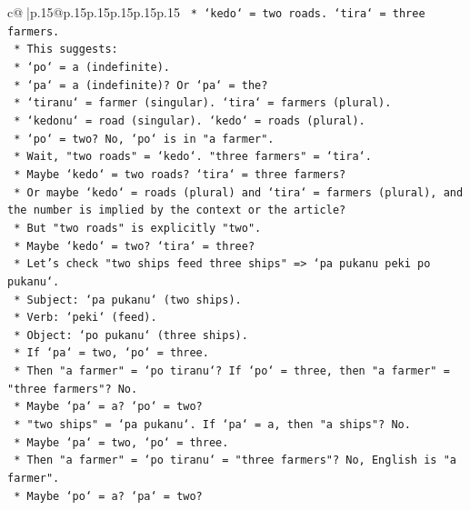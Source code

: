 \documentclass{article}
\begin{document}
{\begin{supertabular}{c@{$\;$}|p{.15\linewidth}@{}p{.15\linewidth}p{.15\linewidth}p{.15\linewidth}p{.15\linewidth}p{.15\linewidth}}
{{{\texttt{        *   `kedo` = two roads. `tira` = three farmers.} \\
\texttt{        *   This suggests:} \\
\texttt{            *   `po` = a (indefinite).} \\
\texttt{            *   `pa` = a (indefinite)? Or `pa` = the?} \\
\texttt{            *   `tiranu` = farmer (singular). `tira` = farmers (plural).} \\
\texttt{            *   `kedonu` = road (singular). `kedo` = roads (plural).} \\
\texttt{            *   `po` = two? No, `po` is in "a farmer".} \\
\texttt{            *   Wait, "two roads" = `kedo`. "three farmers" = `tira`.} \\
\texttt{            *   Maybe `kedo` = two roads? `tira` = three farmers?} \\
\texttt{            *   Or maybe `kedo` = roads (plural) and `tira` = farmers (plural), and the number is implied by the context or the article?} \\
\texttt{            *   But "two roads" is explicitly "two".} \\
\texttt{            *   Maybe `kedo` = two? `tira` = three?} \\
\texttt{            *   Let's check "two ships feed three ships" => `pa pukanu peki po pukanu`.} \\
\texttt{                *   Subject: `pa pukanu` (two ships).} \\
\texttt{                *   Verb: `peki` (feed).} \\
\texttt{                *   Object: `po pukanu` (three ships).} \\
\texttt{                *   If `pa` = two, `po` = three.} \\
\texttt{                *   Then "a farmer" = `po tiranu`? If `po` = three, then "a farmer" = "three farmers"? No.} \\
\texttt{                *   Maybe `pa` = a? `po` = two?} \\
\texttt{                *   "two ships" = `pa pukanu`. If `pa` = a, then "a ships"? No.} \\
\texttt{                *   Maybe `pa` = two, `po` = three.} \\
\texttt{                *   Then "a farmer" = `po tiranu` = "three farmers"? No, English is "a farmer".} \\
\texttt{                *   Maybe `po` = a? `pa` = two?} \\
}}}
\end{supertabular}}
\end{document}
